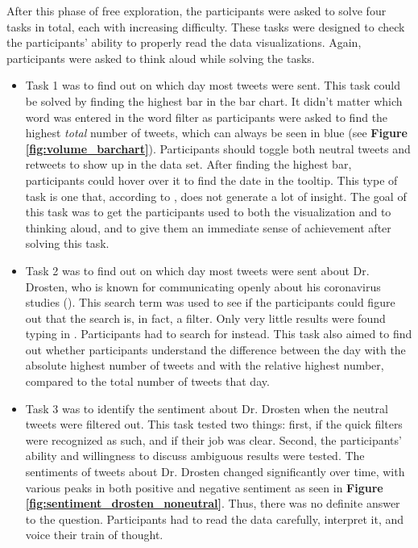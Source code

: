 After this phase of free exploration, the participants were asked to solve four tasks in total, each with increasing difficulty. These tasks were designed to check the participants' ability to properly read the data visualizations. Again, participants were asked to think aloud while solving the tasks.

\begin{itemize}
    \item Task 1 was to find out on which day most tweets were sent. This task could be solved by finding the highest bar in the bar chart. It didn't matter which word was entered in the word filter as participants were asked to find the highest \emph{total} number of tweets, which can always be seen in blue (see \textbf{Figure \ref{fig:volume_barchart}}). Participants should toggle both neutral tweets and retweets to show up in the data set. After finding the highest bar, participants could hover over it to find the date in the tooltip. This type of task is one that, according to \citeauthor{northMeasuringVisualizationInsight2006}, does not generate a lot of insight. The goal of this task was to get the participants used to both the visualization and to thinking aloud, and to give them an immediate sense of achievement after solving this task.
    \item Task 2 was to find out on which day most tweets were sent about Dr. Drosten, who is known for communicating openly about his coronavirus studies (\cite{henleyCoronavirusMeetScientists2020}). This search term was used to see if the participants could figure out that the search is, in fact, a filter. Only very little results were found typing in . Participants had to search for  instead. This task also aimed to find out whether participants understand the difference between the day with the absolute highest number of tweets and with the relative highest number, compared to the total number of tweets that day.
    \item Task 3 was to identify the sentiment about Dr. Drosten when the neutral tweets were filtered out. This task tested two things: first, if the quick filters were recognized as such, and if their job was clear. Second, the participants' ability and willingness to discuss ambiguous results were tested. The sentiments of tweets about Dr. Drosten changed significantly over time, with various peaks in both positive and negative sentiment as seen in \textbf{Figure \ref{fig:sentiment_drosten_noneutral}}. Thus, there was no definite answer to the question. Participants had to read the data carefully, interpret it, and voice their train of thought.

\end{itemize}
